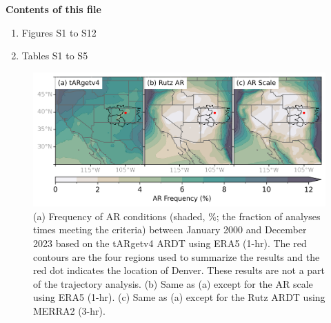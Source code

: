 \documentclass[draft,jgrga]{agutexSI2019}
\begin{document}
\begin{article}

%
%



\noindent\textbf{Contents of this file}
\begin{enumerate}
\item Figures S1 to S12
\item Tables S1 to S5
\end{enumerate}


\begin{figure}
\noindent\includegraphics[width=\textwidth]{figS1.png}
\caption{(a) Frequency of AR conditions (shaded, \%; the fraction of analyses times meeting the criteria) between January 2000 and December 2023 based on the tARgetv4 ARDT using ERA5 (1-hr). The red contours are the four regions used to summarize the results and the red dot indicates the location of Denver. These results are not a part of the trajectory analysis. (b) Same as (a) except for the AR scale using ERA5 (1-hr). (c) Same as (a) except for the Rutz ARDT using MERRA2 (3-hr).}
\label{fig:supp:ar_overhead}
\end{figure}


\end{article}
\end{document}
